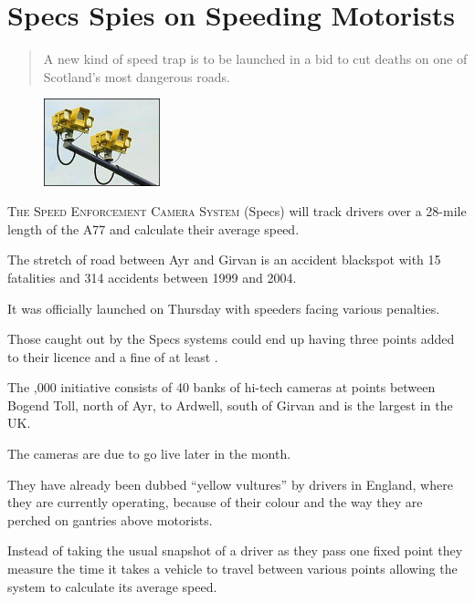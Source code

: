 \documentclass[11pt]{article}
\begin{document}
\drawtitle

\vspace{-.4in}

\section*{Specs Spies on Speeding Motorists}

\begin{abstract}
  \noindent A new kind of speed trap is to be launched in a bid to cut
  deaths on one of Scotland's most dangerous roads.
\end{abstract}

\begin{figure}
  \begin{center}
    \includegraphics[width=0.3\textwidth]{camera.jpg}
  \end{center}
\end{figure}

\lettrine[lines=1]{T}{he Speed Enforcement Camera System} (Specs) will
track drivers over a 28-mile length of the A77 and calculate their
average speed.

The stretch of road between Ayr and Girvan is an accident blackspot
with 15 fatalities and 314 accidents between 1999 and 2004.

It was officially launched on Thursday with speeders facing various
penalties.

Those caught out by the Specs systems could end up having three points
added to their licence and a fine of at least .

The ,000 initiative consists of 40 banks of hi-tech
cameras at points between Bogend Toll, north of Ayr, to Ardwell, south
of Girvan and is the largest in the UK.

The cameras are due to go live later in the month.

They have already been dubbed ``yellow vultures'' by drivers in England,
where they are currently operating, because of their colour and the
way they are perched on gantries above motorists.

Instead of taking the usual snapshot of a driver as they pass one
fixed point they measure the time it takes a vehicle to travel between
various points allowing the system to calculate its average speed.
\end{document}
